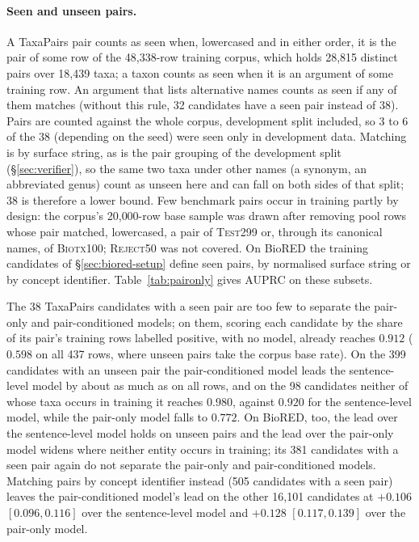 \documentclass[11pt]{article}
\newcommand{\bench}{\mbox{TaxaPairs}}
\begin{document}
\paragraph{Seen and unseen pairs.}
A \bench{} pair counts as seen when, lowercased and in either order, it is the pair of some row of
the 48{,}338-row training corpus, which holds 28{,}815 distinct pairs over 18{,}439 taxa; a taxon
counts as seen when it is an argument of some training row. An argument that lists alternative
names counts as seen if any of them matches (without this rule, 32 candidates have a seen pair instead of 38).
Pairs are counted against the whole corpus, development split included, so 3 to 6 of the 38
(depending on the seed) were seen only in development data. Matching is by surface string, as is
the pair grouping of the development split (\S\ref{sec:verifier}), so the same two taxa under other
names (a synonym, an abbreviated genus) count as unseen here and can fall on both sides of that
split; 38 is therefore a lower bound. Few benchmark pairs occur in training partly by design: the
corpus's 20{,}000-row base sample was drawn after removing pool rows whose pair matched, lowercased,
a pair of \textsc{Test299} or, through its canonical names, of \textsc{Biotx100}; \textsc{Reject50}
was not covered. On BioRED the training candidates of \S\ref{sec:biored-setup} define seen pairs,
by normalised surface string or by concept identifier. Table~\ref{tab:paironly} gives AUPRC on these
subsets.

The 38 \bench{} candidates with a seen pair are too few to separate the pair-only and
pair-conditioned models; on them, scoring each candidate by the share of its pair's training rows
labelled positive, with no model, already reaches $0.912$ ($0.598$ on all 437 rows, where unseen
pairs take the corpus base rate). On the 399 candidates with an unseen pair the pair-conditioned
model leads the sentence-level model by about as much as on all rows, and on the 98 candidates
neither of whose taxa occurs in training it reaches $0.980$, against $0.920$ for the sentence-level
model, while the pair-only model falls to $0.772$. On BioRED, too, the lead over the sentence-level
model holds on unseen pairs and the lead over the pair-only model widens where neither entity
occurs in training; its 381 candidates with a seen pair again do not separate the pair-only and
pair-conditioned models. Matching pairs by concept identifier instead (505 candidates with a seen
pair) leaves the pair-conditioned model's lead on the other 16{,}101 candidates at $+0.106$
$[0.096, 0.116]$ over the sentence-level model and $+0.128$ $[0.117, 0.139]$ over the pair-only
model.
\end{document}
